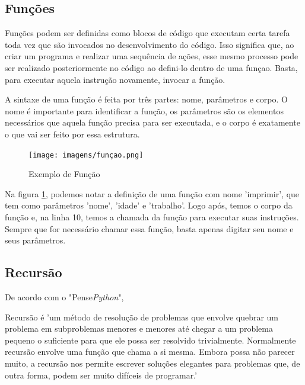 \documentclass[a4paper, 12pt]{article}
\begin{document}
\subsection{Funções}
\label{Funções}
Funções podem ser definidas como blocos de código que executam certa tarefa toda vez que são invocados no desenvolvimento do código. Isso significa que, ao criar um programa e realizar uma sequência de ações, esse mesmo processo pode ser realizado posteriormente no código ao defini-lo dentro de uma funçao. Basta, para executar aquela instrução novamente, invocar a função.

A sintaxe de uma função é feita por três partes: nome, parâmetros e corpo. O nome é importante para identificar a função, os parâmetros são os elementos necessários que aquela função precisa para ser executada, e o corpo é exatamente o que vai ser feito por essa estrutura. 
\begin{figure}[!h]
    \centering
    \texttt{[image: imagens/funçao.png]}
    \caption{Exemplo de Função}
    \label{função}
\end{figure}

\pagebreak
Na figura \ref{função}, podemos notar a definição de uma função com nome 'imprimir', que tem como parâmetros 'nome', 'idade' e 'trabalho'. Logo após, temos o corpo da função e, na linha 10, temos a chamada da função para executar suas instruções. Sempre que for necessário chamar essa função, basta apenas digitar seu nome e seus parâmetros.

\subsection{Recursão}

De acordo com o "Pense\textit{Python}",

\begin{quoting}[rightmargin=0cm,leftmargin=4cm]

\begin{singlespace}
    {\footnotesize 
    Recursão é 'um método de resolução de problemas que envolve quebrar um problema em subproblemas menores e menores até chegar a um problema pequeno o suficiente para que ele possa ser resolvido trivialmente. Normalmente recursão envolve uma função que chama a si mesma. Embora possa não parecer muito, a recursão nos permite escrever soluções elegantes para problemas que, de outra forma, podem ser muito difíceis de programar.' \cite{recursao}
    }
\end{singlespace}

\end{quoting}
\end{document}
